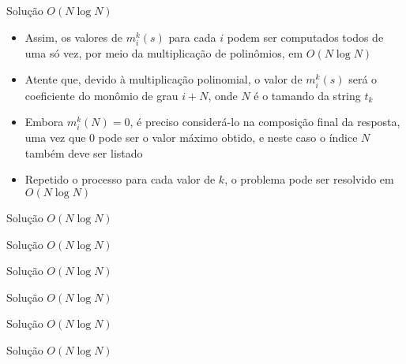 \begin{frame}[fragile]{Solução $O(N\log N)$}

    \begin{itemize}
        \item Assim, os valores de $m^k_i(s)$ para cada $i$ podem ser computados todos de uma
            só vez, por meio da multiplicação de polinômios, em $O(N\log N)$

        \item Atente que, devido à multiplicação polinomial, o valor de $m^k_i(s)$ será o 
            coeficiente do monômio de grau $i + N$, onde $N$ é o tamando da string $t_k$

        \item Embora $m^k_i(N) = 0$, é preciso considerá-lo na composição final da resposta,
            uma vez que $0$ pode ser o valor máximo obtido, e neste caso o índice $N$ também
            deve ser listado

        \item Repetido o processo para cada valor de $k$, o problema pode ser resolvido em
            $O(N\log N)$
    \end{itemize}

\end{frame}

\begin{frame}[fragile]{Solução $O(N\log N)$}
\end{frame}

\begin{frame}[fragile]{Solução $O(N\log N)$}
\end{frame}

\begin{frame}[fragile]{Solução $O(N\log N)$}
\end{frame}

\begin{frame}[fragile]{Solução $O(N\log N)$}
\end{frame}

\begin{frame}[fragile]{Solução $O(N\log N)$}
\end{frame}

\begin{frame}[fragile]{Solução $O(N\log N)$}
\end{frame}

